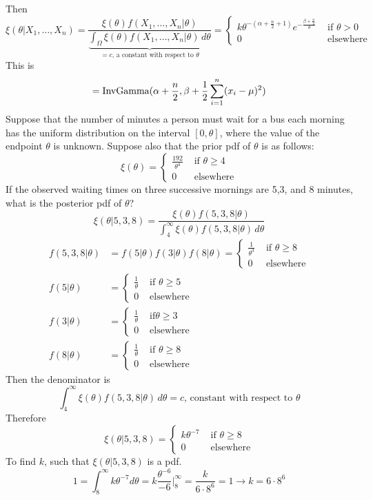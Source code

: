 \documentclass[12pt]{article}
\begin{document}
Then $$\xi(\theta | X_1,\dots,X_n) = \frac{\xi(\theta) f(X_1,\dots,X_n | \theta)}{\underbrace{\int_{\Omega} \xi(\theta) f(X_1,\dots,X_n | \theta) \, d\theta}_{ = c \text{, a constant with respect to } \theta}} = \begin{cases} k\theta^{-(\alpha + \frac{n}{2} + 1)} e^{-\frac{\beta + \frac{\alpha}{2}}{\theta}} &\text{ if } \theta > 0 \\ 0 &\text{ elsewhere } \end{cases} $$ This is $$ = \text{InvGamma}( \alpha + \frac{n}{2}, \beta + \frac{1}{2} \sum_{i=1}^n (x_i - \mu)^2 ) $$ 
Suppose that the number of minutes a person must wait for a bus each morning has the uniform distribution on the interval $[0,\theta]$, where the value of the endpoint $\theta$ is unknown. Suppose also that the prior pdf of $\theta$ is as follows: $$ \xi(\theta) = \begin{cases} \frac{192}{\theta^4} &\text{ if } \theta \geq 4 \\ 0 &\text{ elsewhere} \end{cases} $$ 
If the observed waiting times on three successive mornings are 5,3, and 8 minutes, what is the posterior pdf of $\theta$? \\ 
$$ \xi(\theta | 5,3,8) = \frac{\xi(\theta) f(5,3,8 | \theta)}{\int_4^\infty \xi(\theta) f(5,3,8|\theta) \, d\theta} $$ 
$$ \begin{aligned} f(5,3,8|\theta) &= f(5|\theta)f(3|\theta)f(8|\theta) = \begin{cases} \frac{1}{\theta^3} &\text{ if } \theta \geq 8 \\ 0 &\text{ elsewhere} \end{cases} \\
f(5|\theta) &= \begin{cases} \frac{1}{\theta} &\text{ if } \theta \geq 5 \\ 0 &\text{ elsewhere} \end{cases} \\ f(3|\theta) &= \begin{cases} \frac{1}{\theta} &\text{ if} \theta \geq 3 \\ 0 &\text{ elsewhere} \end{cases} \\ f(8|\theta) &= \begin{cases} \frac{1}{\theta} &\text{ if } \theta \geq 8 \\ 0 &\text{ elsewhere }\end{cases} \end{aligned} $$ 
Then the denominator is $$  \int_4^\infty \xi(\theta)f(5,3,8|\theta) \, d\theta = c \text{, constant with respect to } \theta  $$ 
Therefore $$\xi(\theta | 5,3,8) = \begin{cases} k\theta^{-7} &\text{ if } \theta \geq 8 \\ 0 &\text{ elsewhere} \end{cases} $$ 
To find $k$, such that $\xi(\theta | 5,3,8)$ is a pdf. $$ 1 = \int_8^\infty k\theta^{-7} d\theta = k \frac{\theta^{-6}}{-6}\Big|_8^\infty = \frac{k}{6 \cdot 8^6} = 1 \to k = 6 \cdot 8^6 $$ 
\end{document}
